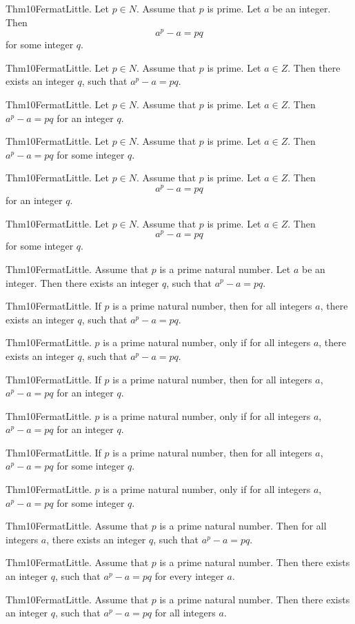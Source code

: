 \documentclass{article}
\begin{document}
Thm10FermatLittle. Let $p \in N$. Assume that $p$ is prime. Let $a$ be an integer. Then $$a ^ {p}- a = p q$$ for some integer $q$.

Thm10FermatLittle. Let $p \in N$. Assume that $p$ is prime. Let $a \in Z$. Then there exists an integer $q$, such that $a ^ {p}- a = p q$.

Thm10FermatLittle. Let $p \in N$. Assume that $p$ is prime. Let $a \in Z$. Then $a ^ {p}- a = p q$ for an integer $q$.

Thm10FermatLittle. Let $p \in N$. Assume that $p$ is prime. Let $a \in Z$. Then $a ^ {p}- a = p q$ for some integer $q$.

Thm10FermatLittle. Let $p \in N$. Assume that $p$ is prime. Let $a \in Z$. Then $$a ^ {p}- a = p q$$ for an integer $q$.

Thm10FermatLittle. Let $p \in N$. Assume that $p$ is prime. Let $a \in Z$. Then $$a ^ {p}- a = p q$$ for some integer $q$.

Thm10FermatLittle. Assume that $p$ is a prime natural number. Let $a$ be an integer. Then there exists an integer $q$, such that $a ^ {p}- a = p q$.

Thm10FermatLittle. If $p$ is a prime natural number, then for all integers $a$, there exists an integer $q$, such that $a ^ {p}- a = p q$.

Thm10FermatLittle. $p$ is a prime natural number, only if for all integers $a$, there exists an integer $q$, such that $a ^ {p}- a = p q$.

Thm10FermatLittle. If $p$ is a prime natural number, then for all integers $a$, $a ^ {p}- a = p q$ for an integer $q$.

Thm10FermatLittle. $p$ is a prime natural number, only if for all integers $a$, $a ^ {p}- a = p q$ for an integer $q$.

Thm10FermatLittle. If $p$ is a prime natural number, then for all integers $a$, $a ^ {p}- a = p q$ for some integer $q$.

Thm10FermatLittle. $p$ is a prime natural number, only if for all integers $a$, $a ^ {p}- a = p q$ for some integer $q$.

Thm10FermatLittle. Assume that $p$ is a prime natural number. Then for all integers $a$, there exists an integer $q$, such that $a ^ {p}- a = p q$.

Thm10FermatLittle. Assume that $p$ is a prime natural number. Then there exists an integer $q$, such that $a ^ {p}- a = p q$ for every integer $a$.

Thm10FermatLittle. Assume that $p$ is a prime natural number. Then there exists an integer $q$, such that $a ^ {p}- a = p q$ for all integers $a$.
\end{document}
